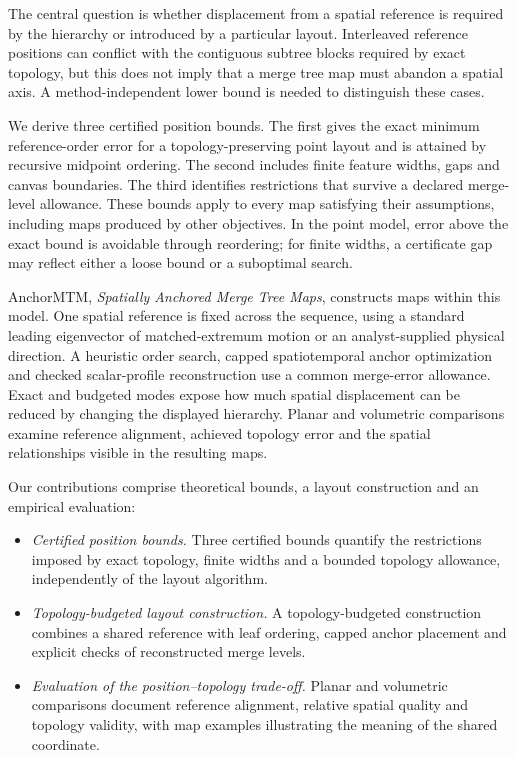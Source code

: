 \documentclass[review]{vgtc}
\begin{document}
The central question is whether displacement from a spatial reference is required by the hierarchy or introduced by a particular layout. Interleaved reference positions can conflict with the contiguous subtree blocks required by exact topology, but this does not imply that a merge tree map must abandon a spatial axis. A method-independent lower bound is needed to distinguish these cases. 

We derive three certified position bounds. The first gives the exact minimum reference-order error for a topology-preserving point layout and is attained by recursive midpoint ordering. The second includes finite feature widths, gaps and canvas boundaries. The third identifies restrictions that survive a declared merge-level allowance. These bounds apply to every map satisfying their assumptions, including maps produced by other objectives. In the point model, error above the exact bound is avoidable through reordering; for finite widths, a certificate gap may reflect either a loose bound or a suboptimal search.

AnchorMTM, \emph{Spatially Anchored Merge Tree Maps}, constructs maps within this model. One spatial reference is fixed across the sequence, using a standard leading eigenvector of matched-extremum motion or an analyst-supplied physical direction. A heuristic order search, capped spatiotemporal anchor optimization and checked scalar-profile reconstruction use a common merge-error allowance. Exact and budgeted modes expose how much spatial displacement can be reduced by changing the displayed hierarchy. Planar and volumetric comparisons examine reference alignment, achieved topology error and the spatial relationships visible in the resulting maps.

Our contributions comprise theoretical bounds, a layout construction and an empirical evaluation:
\begin{itemize}
\setlength{\itemsep}{2pt}
\setlength{\parsep}{0pt}
\item \emph{Certified position bounds.} Three certified bounds quantify the restrictions imposed by exact topology, finite widths and a bounded topology allowance, independently of the layout algorithm.
\item \emph{Topology-budgeted layout construction.} A topology-budgeted construction combines a shared reference with leaf ordering, capped anchor placement and explicit checks of reconstructed merge levels.
\item \emph{Evaluation of the position--topology trade-off.} Planar and volumetric comparisons document reference alignment, relative spatial quality and topology validity, with map examples illustrating the meaning of the shared coordinate.
\end{itemize}
\end{document}
